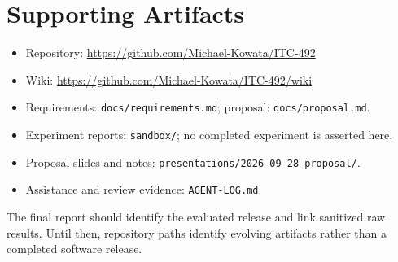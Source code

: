 \section{Supporting Artifacts}
\begin{itemize}
\item Repository: \url{https://github.com/Michael-Kowata/ITC-492}
\item Wiki: \url{https://github.com/Michael-Kowata/ITC-492/wiki}
\item Requirements: \texttt{docs/requirements.md}; proposal: \texttt{docs/proposal.md}.
\item Experiment reports: \texttt{sandbox/}; no completed experiment is asserted here.
\item Proposal slides and notes: \texttt{presentations/2026-09-28-proposal/}.
\item Assistance and review evidence: \texttt{AGENT-LOG.md}.
\end{itemize}
The final report should identify the evaluated release and link sanitized raw
results. Until then, repository paths identify evolving artifacts rather than
a completed software release.
